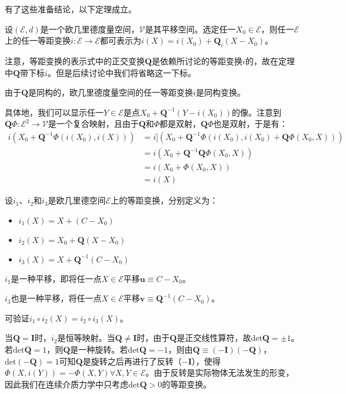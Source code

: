 \documentclass[main.tex]{subfiles}
\begin{document}
有了这些准备结论，以下定理成立。

\begin{theorem}
设$\left(\mathcal{E},d\right)$是一个欧几里德度量空间，$\mathcal{V}$是其平移空间。选定任一$X_0\in\mathcal{E}$，则任一$\mathcal{E}$上的任一等距变换$i:\mathcal{E}\rightarrow\mathcal{E}$都可表示为$i\left(X\right)=i\left(X_0\right)+\mathbf{Q}_i\left(X-X_0\right)$。
\end{theorem}

注意，等距变换的表示式中的正交变换$\mathbf{Q}$是依赖所讨论的等距变换$i$的，故在定理中$\mathbf{Q}$带下标$i$。但是后续讨论中我们将省略这一下标。

由于$\mathbf{Q}$是同构的，欧几里德度量空间的任一等距变换$i$是同构变换。

具体地，我们可以显示任一$Y\in\mathcal{E}$是点$X_0+\mathbf{Q}^{-1}\left(Y-i\left(X_0\right)\right)$的像。注意到$\mathbf{Q}\Phi:\mathcal{E}^2\rightarrow\mathcal{V}$是一个复合映射，且由于$\mathbf{Q}$和$\Phi$都是双射，$\mathbf{Q}\Phi$也是双射，于是有：
\begin{align*}
    i\left(X_0+\mathbf{Q}^{-1}\Phi\left(i\left(X_0\right),i\left(X\right)\right)\right)&=i]\left(X_0+\mathbf{Q}^{-1}\Phi\left(i\left(X_0\right),i\left(X_0\right)+\mathbf{Q}\Phi\left(X_0,X\right)\right)\right)\\
    &=i\left(X_0+\mathbf{Q}^{-1}\mathbf{Q}\Phi\left(X_0,X\right)\right)\\
    &=i\left(X_0+\Phi\left(X_0,X\right)\right)\\
    &=i\left(X\right)
\end{align*}

\begin{example}
设$i_1$、$i_2$和$i_3$是欧几里德空间$\mathcal{E}$上的等距变换，分别定义为：
\begin{itemize}
    \item $i_1\left(X\right)=X+\left(C-X_0\right)$
    \item $i_2\left(X\right)=X_0+\mathbf{Q}\left(X-X_0\right)$
    \item $i_3\left(X\right)=X+\mathbf{Q}^{-1}\left(C-X_0\right)$
\end{itemize}

$i_1$是一种平移，即将任一点$X\in\mathcal{E}$平移$\mathbf{u}\equiv C-X_0$。

$i_3$也是一种平移，将任一点$X\in\mathcal{E}$平移$\mathbf{v}\equiv \mathbf{Q}^{-1}\left(C-X_0\right)$。

可验证$i_1\circ i_2\left(X\right)=i_2\circ i_3\left(X\right)$。

当$\mathbf{Q}=\mathbf{I}$时，$i_2$是恒等映射。当$\mathbf{Q}\neq\mathbf{I}$时，由于$\mathbf{Q}$是正交线性算符，故$\mathrm{det}\mathbf{Q}=\pm 1$。若$\mathrm{det}\mathbf{Q}=1$，则$\mathbf{Q}$是一种旋转。若$\mathrm{det}\mathbf{Q}=-1$，则由$\mathbf{Q}\equiv\left(-\mathbf{I}\right)\left(-\mathbf{Q}\right)$，$\mathrm{det}\left(-\mathbf{Q}\right)=1$可知$\mathbf{Q}$是旋转之后再进行了反转（$-\mathbf{I}$），使得$\Phi\left(X,i\left(Y\right)\right)=-\Phi\left(X,Y\right)\forall X,Y\in\mathcal{E}$。由于反转是实际物体无法发生的形变，因此我们在连续介质力学中只考虑$\mathrm{det}\mathbf{Q}>0$的等距变换。
\end{example}
\end{document}
